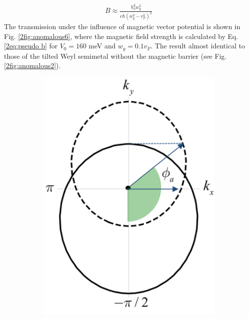     \begin{align} \label{2eq:pseudo b}
        B \approx \frac{V_0^2 w_y^2}{e \hbar (w_y^2-v_F^2)^2}
    \end{align}
    The transmission under the influence of magnetic vector potential is shown in Fig. \ref{2fig:anomalous6}, where the magnetic field strength is calculated by Eq. \ref{2eq:pseudo b} for $V_0 = 160$ meV and $w_y = 0.1 v_F$.
    The result almost identical to those of the tilted Weyl semimetal without the magnetic barrier (see Fig. \ref{2fig:anomalous2}).
    \begin{figure}[H]
        \centering
        \begin{subfigure}[b]{0.4\linewidth}
            \includegraphics[width = \linewidth]{fig/Chap 2/anomalous fermi surface1.png}

\end{subfigure}
\end{figure}
